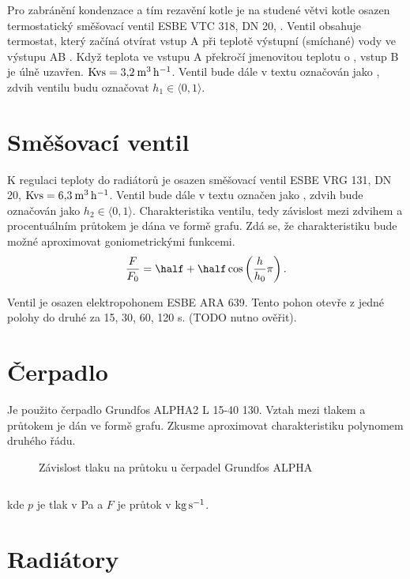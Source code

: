 \documentclass[a4paper,draft]{book}
\begin{document}
    Pro zabránění kondenzace a tím rezavění kotle je na studené větvi kotle
    osazen termostatický směšovací ventil ESBE VTC 318, DN 20, .
    Ventil obsahuje termostat, který začíná otvírat vstup A při teplotě výstupní 
    (smíchané) vody ve výstupu AB . Když teplota ve vstupu A překročí
    jmenovitou teplotu o , vstup B je úlně uzavřen.
    $\rm Kvs = 3{,}2\: m^3\, h^{-1}$. Ventil bude dále v textu označován jako
    \SVA, zdvih ventilu budu označovat $h_1 \in \langle 0, 1 \rangle$. 

  \section{Směšovací ventil}

    K regulaci teploty do radiátorů je osazen směšovací ventil ESBE VRG 131,
    DN 20, $\rm Kvs = 6{,}3\: m^3\, h^{-1}$. Ventil bude dále v textu označen
    jako \SVB, zdvih bude označován jako $h_2 \in \langle 0, 1 \rangle$.
    Charakteristika ventilu, tedy závislost mezi zdvihem a procentuálním
    průtokem je dána ve formě grafu. Zdá se, že charakteristiku bude možné
    aproximovat goniometrickými funkcemi.
    $$\frac{F}{F_0} = \half + \half \cos\left(\frac{h}{h_0} \pi\right).$$

    Ventil je osazen elektropohonem ESBE ARA 639. Tento pohon otevře z jedné
    polohy do druhé za 15, 30, 60, 120 s. (TODO nutno ověřit).

  \section{Čerpadlo}

    Je použito čerpadlo Grundfos ALPHA2 L 15-40 130. Vztah mezi tlakem
    a průtokem je dán ve formě grafu. Zkusme aproximovat charakteristiku
    polynomem druhého řádu.

    \begin{figure}[hp]
      \centering
      \caption{Závislost tlaku na průtoku u čerpadel Grundfos ALPHA}
    \end{figure}

    \begin{equation}
    \end{equation}

    kde $p$ je tlak v Pa a $F$ je průtok v $\rm kg\,s^{-1}$.

  \section{Radiátory}
\end{document}
